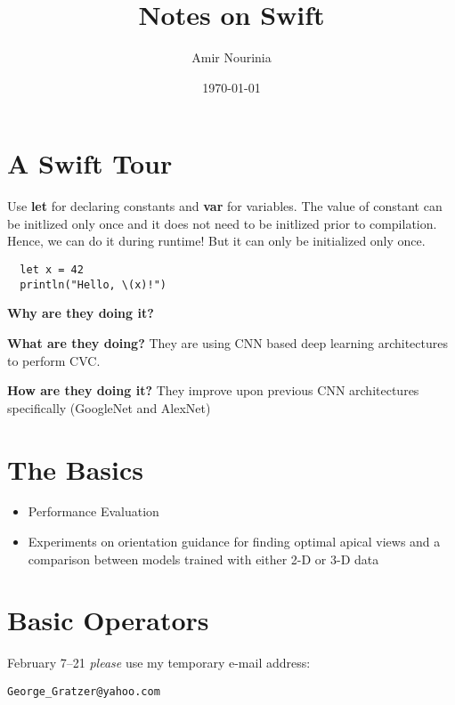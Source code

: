 \documentclass[]{amsart}
\begin{document}
\title{Notes on Swift}
\author{Amir Nourinia}
\date{\today}
\maketitle

\section*{A Swift Tour}
Use \textbf{let} for declaring constants and \textbf{var} for variables. The value of constant
can be initlized only once and it does not need to be initlized prior to compilation. Hence, we can
do it during runtime! But it can only be initialized only once.

\begin{verbatim}
  let x = 42
  println("Hello, \(x)!")
\end{verbatim}


\textbf{Why are they doing it?}

\textbf{What are they doing?}
They are using CNN based deep learning architectures to perform CVC.

\textbf{How are they doing it?}
They improve upon previous CNN architectures specifically (GoogleNet and AlexNet)

\section*{The Basics}
  \begin{itemize}
    \item Performance Evaluation
    \item Experiments on orientation guidance for finding optimal apical views 
    and a comparison between models trained with either 2-D or 3-D data
  \end{itemize}

\section*{Basic Operators}

  February 7--21 \emph{please} use my
  temporary e-mail address:
  \begin{center}
  \texttt{George\_Gratzer@yahoo.com}
    \end{center}
\end{document}

